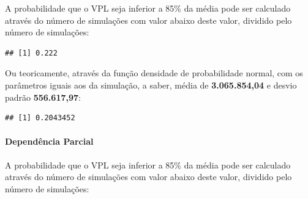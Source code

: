 \documentclass[a4paper]{article}
\newenvironment{Shaded}{\begin{snugshade}}{\end{snugshade}}
\newcommand{\KeywordTok}[1]{\textcolor[rgb]{0.13,0.29,0.53}{\textbf{#1}}}
\newcommand{\DataTypeTok}[1]{\textcolor[rgb]{0.13,0.29,0.53}{#1}}
\newcommand{\DecValTok}[1]{\textcolor[rgb]{0.00,0.00,0.81}{#1}}
\newcommand{\FloatTok}[1]{\textcolor[rgb]{0.00,0.00,0.81}{#1}}
\newcommand{\StringTok}[1]{\textcolor[rgb]{0.31,0.60,0.02}{#1}}
\newcommand{\OperatorTok}[1]{\textcolor[rgb]{0.81,0.36,0.00}{\textbf{#1}}}
\newcommand{\NormalTok}[1]{#1}
\let\oldparagraph\paragraph
\renewcommand{\paragraph}[1]{\oldparagraph{#1}\mbox{}}
\begin{document}
A probabilidade que o VPL seja inferior a 85\% da média pode ser
calculado através do número de simulações com valor abaixo deste valor,
dividido pelo número de simulações:

\begin{Shaded}
\end{Shaded}

\begin{verbatim}
## [1] 0.222
\end{verbatim}

Ou teoricamente, através da função densidade de probabilidade normal,
com os parâmetros iguais aos da simulação, a saber, média de
\textbf{3.065.854,04} e desvio padrão \textbf{556.617,97}:

\begin{Shaded}
\end{Shaded}

\begin{verbatim}
## [1] 0.2043452
\end{verbatim}

\paragraph{Dependência Parcial}\label{dependencia-parcial}

A probabilidade que o VPL seja inferior a 85\% da média pode ser
calculado através do número de simulações com valor abaixo deste valor,
dividido pelo número de simulações:

\begin{Shaded}
\end{Shaded}
\end{document}
